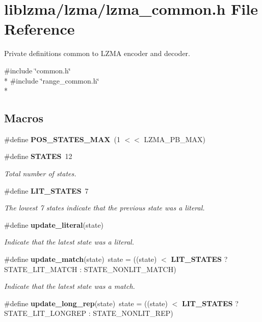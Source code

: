 \section{liblzma/lzma/lzma\-\_\-common.h File Reference}
\label{lzma__common_8h}


Private definitions common to L\-Z\-M\-A encoder and decoder.  


{\ttfamily \#include \char`\"{}common.\-h\char`\"{}}\\*
{\ttfamily \#include \char`\"{}range\-\_\-common.\-h\char`\"{}}\\*
\subsection*{Macros}
\begin{DoxyCompactItemize}
\item 
\#define {\bf P\-O\-S\-\_\-\-S\-T\-A\-T\-E\-S\-\_\-\-M\-A\-X}~(1 $<$$<$ L\-Z\-M\-A\-\_\-\-P\-B\-\_\-\-M\-A\-X)
\item 
\#define {\bf S\-T\-A\-T\-E\-S}~12
\begin{DoxyCompactList}\small\item\em Total number of states. \end{DoxyCompactList}\item 
\#define {\bf L\-I\-T\-\_\-\-S\-T\-A\-T\-E\-S}~7
\begin{DoxyCompactList}\small\item\em The lowest 7 states indicate that the previous state was a literal. \end{DoxyCompactList}\item 
\#define {\bf update\-\_\-literal}(state)
\begin{DoxyCompactList}\small\item\em Indicate that the latest state was a literal. \end{DoxyCompactList}\item 
\#define {\bf update\-\_\-match}(state)~state = ((state) $<$ {\bf L\-I\-T\-\_\-\-S\-T\-A\-T\-E\-S} ? S\-T\-A\-T\-E\-\_\-\-L\-I\-T\-\_\-\-M\-A\-T\-C\-H \-: S\-T\-A\-T\-E\-\_\-\-N\-O\-N\-L\-I\-T\-\_\-\-M\-A\-T\-C\-H)
\begin{DoxyCompactList}\small\item\em Indicate that the latest state was a match. \end{DoxyCompactList}\item 
\#define {\bf update\-\_\-long\-\_\-rep}(state)~state = ((state) $<$ {\bf L\-I\-T\-\_\-\-S\-T\-A\-T\-E\-S} ? S\-T\-A\-T\-E\-\_\-\-L\-I\-T\-\_\-\-L\-O\-N\-G\-R\-E\-P \-: S\-T\-A\-T\-E\-\_\-\-N\-O\-N\-L\-I\-T\-\_\-\-R\-E\-P)
$$
\end{DoxyCompactItemize}
